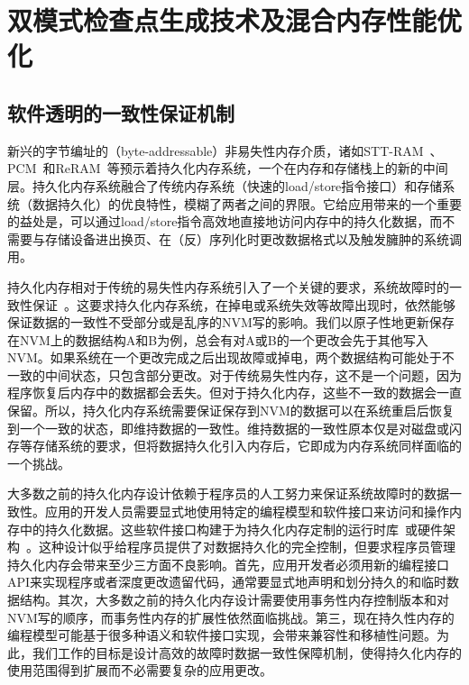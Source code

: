 \chapter{双模式检查点生成技术及混合内存性能优化}
\label{chap:thnvm}

\section{软件透明的一致性保证机制}

新兴的字节编址的（byte-addressable）非易失性内存介质，诸如STT-RAM~\cite{4443191}、PCM~\cite{Raoux:2008:PRA}和ReRAM~\cite{5607274}等预示着持久化内存系统，一个在内存和存储栈上的新的中间层。持久化内存系统融合了传统内存系统（快速的load/store指令接口）和存储系统（数据持久化）的优良特性，模糊了两者之间的界限。它给应用带来的一个重要的益处是，可以通过load/store指令高效地直接地访问内存中的持久化数据，而不需要与存储设备进出换页、在（反）序列化时更改数据格式以及触发臃肿的系统调用。

持久化内存相对于传统的易失性内存系统引入了一个关键的要求，系统故障时的一致性保证~\cite{Lamb:1991:ODS,Copeland:1989:CSR,Shapiro:1999:EFC}。这要求持久化内存系统，在掉电或系统失效等故障出现时，依然能够保证数据的一致性不受部分或是乱序的NVM写的影响。我们以原子性地更新保存在NVM上的数据结构A和B为例，总会有对A或B的一个更改会先于其他写入NVM。如果系统在一个更改完成之后出现故障或掉电，两个数据结构可能处于不一致的中间状态，只包含部分更改。对于传统易失性内存，这不是一个问题，因为程序恢复后内存中的数据都会丢失。但对于持久化内存，这些不一致的数据会一直保留。所以，持久化内存系统需要保证保存到NVM的数据可以在系统重启后恢复到一个一致的状态，即维持数据的一致性。维持数据的一致性原本仅是对磁盘或闪存等存储系统的要求，但将数据持久化引入内存后，它即成为内存系统同样面临的一个挑战。

大多数之前的持久化内存设计依赖于程序员的人工努力来保证系统故障时的数据一致性。应用的开发人员需要显式地使用特定的编程模型和软件接口来访问和操作内存中的持久化数据。这些软件接口构建于为持久化内存定制的运行时库~\cite{Condit:2009:BIT:1629575.1629589,Volos:2011:MLP:1950365.1950379}或硬件架构~\cite{Zhao:2013:KCP:2540708.2540744}。这种设计似乎给程序员提供了对数据持久化的完全控制，但要求程序员管理持久化内存会带来至少三方面不良影响。首先，应用开发者必须用新的编程接口API来实现程序或者深度更改遗留代码，通常要显式地声明和划分持久的和临时数据结构。其次，大多数之前的持久化内存设计需要使用事务性内存控制版本和对NVM写的顺序，而事务性内存的扩展性依然面临挑战。第三，现在持久性内存的编程模型可能基于很多种语义和软件接口实现，会带来兼容性和移植性问题。为此，我们工作的目标是设计高效的故障时数据一致性保障机制，使得持久化内存的使用范围得到扩展而不必需要复杂的应用更改。

